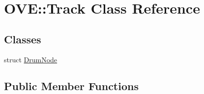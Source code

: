 \hypertarget{class_o_v_e_1_1_track}{}\section{O\+VE\+:\+:Track Class Reference}
\label{class_o_v_e_1_1_track}
\subsection*{Classes}
\begin{DoxyCompactItemize}
\item 
struct \hyperlink{struct_o_v_e_1_1_track_1_1_drum_node}{Drum\+Node}
\end{DoxyCompactItemize}
\subsection*{Public Member Functions}
